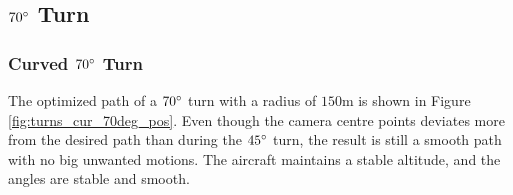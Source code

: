\subsection{$70\degree$ Turn}

\subsubsection{Curved $70\degree$ Turn}

The optimized path of a $70\degree$ turn with a radius of $150$m is shown in Figure \ref{fig:turns_cur_70deg_pos}. Even though the camera centre points deviates more from the desired path than during the $45\degree$ turn, the result is still a smooth path with no big unwanted motions. The aircraft maintains a stable altitude, and the angles are stable and smooth.

